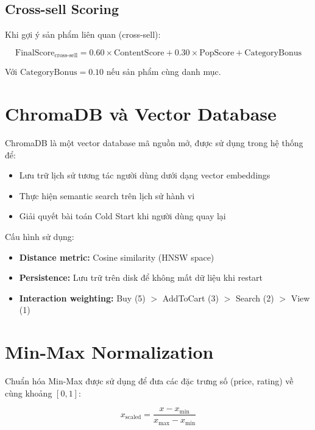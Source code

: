 \documentclass[12pt,a4paper]{report}
\begin{document}
\subsection{Cross-sell Scoring}

Khi gợi ý sản phẩm liên quan (cross-sell):

\begin{equation}
\text{FinalScore}_{\text{cross-sell}} = 0.60 \times \text{ContentScore} + 0.30 \times \text{PopScore} + \text{CategoryBonus}
\end{equation}

Với $\text{CategoryBonus} = 0.10$ nếu sản phẩm cùng danh mục.

\section{ChromaDB và Vector Database}

ChromaDB là một vector database mã nguồn mở, được sử dụng trong hệ thống để:

\begin{itemize}
    \item Lưu trữ lịch sử tương tác người dùng dưới dạng vector embeddings
    \item Thực hiện semantic search trên lịch sử hành vi
    \item Giải quyết bài toán Cold Start khi người dùng quay lại
\end{itemize}

Cấu hình sử dụng:
\begin{itemize}
    \item \textbf{Distance metric:} Cosine similarity (HNSW space)
    \item \textbf{Persistence:} Lưu trữ trên disk để không mất dữ liệu khi restart
    \item \textbf{Interaction weighting:} Buy (5) $>$ AddToCart (3) $>$ Search (2) $>$ View (1)
\end{itemize}

\section{Min-Max Normalization}

Chuẩn hóa Min-Max được sử dụng để đưa các đặc trưng số (price, rating) về cùng khoảng $[0, 1]$:

\begin{equation}
x_{\text{scaled}} = \frac{x - x_{\min}}{x_{\max} - x_{\min}}
\end{equation}
\end{document}
